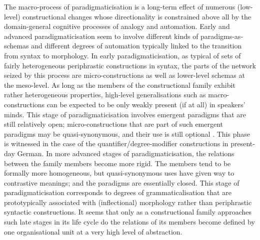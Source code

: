 \documentclass[output=paper]{langsci/langscibook}
\begin{document}
The macro-process of paradigmaticisation is a long-term effect of numerous (low-level) constructional changes whose directionality is constrained above all by the domain-general cognitive processes of analogy and automation. Early and advanced paradigmaticisation seem to involve different kinds of paradigms-as-schemas and different degrees of automation typically linked to the transition from syntax to morphology. In early paradigmaticisation, as typical of sets of fairly heterogeneous periphrastic constructions in syntax, the parts of the network seized by this process are micro\hyp{}constructions as well as lower-level schemas at the meso-level. As long as the members of the constructional family exhibit rather heterogeneous properties, high-level generalisations such as macro-constructions can be expected to be only weakly present (if at all) in speakers’ minds. This stage of paradigmaticisation involves emergent paradigms that are still relatively open; micro\hyp{}constructions that are part of such emergent paradigms may be quasi-synonymous, and their use is still optional \citep[cf.][]{DiewaldParadigmaticintegration2012}. This phase is witnessed in the case of the quantifier\slash degree\hyp{}modifier constructions in present-day German. In more advanced stages of paradigmaticisation, the relations between the family members become more rigid. The members tend to be formally more homogeneous, but quasi-synonymous uses have given way to contrastive meanings; and the paradigms are essentially closed. This stage of paradigmaticisation corresponds to degrees of grammaticalisation that are prototypically associated with (inflectional) morphology rather than periphrastic syntactic constructions. It seems that only as a constructional family approaches such late stages in its life cycle do the relations of its members become defined by one organisational unit at a very high level of abstraction. 
\end{document}
